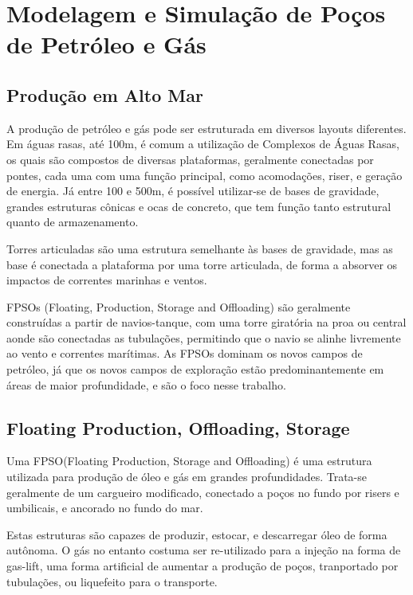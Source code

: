 

\chapter{Modelagem e Simulação de Poços de Petróleo e Gás} \label{chap:2}


\section{Produção em Alto Mar}

A produção de petróleo e gás pode ser estruturada em diversos layouts diferentes.
% 
Em águas rasas, até 100m, é comum a utilização de Complexos de Águas Rasas, os quais são compostos de diversas plataformas, geralmente conectadas por pontes, cada uma com uma função principal, como acomodações, riser, e geração de energia.
%
Já entre 100 e 500m, é possível utilizar-se de bases de gravidade, grandes estruturas cônicas e ocas de concreto, que tem função tanto estrutural quanto de armazenamento. 
%

Torres articuladas são uma estrutura semelhante às bases de gravidade, mas as base é conectada a plataforma por uma torre articulada, de forma a absorver os impactos de correntes marinhas e ventos.
%

FPSOs (Floating, Production, Storage and Offloading) são geralmente construídas a partir de navios-tanque, com uma torre giratória na proa ou central aonde são conectadas as tubulações, permitindo que o navio se alinhe livremente ao vento e correntes marítimas. 
%
As FPSOs dominam os novos campos de petróleo, já que os novos campos de exploração estão predominantemente em áreas de maior profundidade, e são o foco nesse trabalho.

\section{Floating Production, Offloading, Storage}
Uma FPSO(Floating Production, Storage and Offloading) é uma estrutura utilizada para produção de óleo e gás em grandes profundidades. Trata-se geralmente de um cargueiro modificado, conectado a poços no fundo por risers e umbilicais, e ancorado no fundo do mar.

Estas estruturas são capazes de produzir, estocar, e descarregar óleo de forma autônoma. O gás no entanto costuma ser re-utilizado para a injeção na forma de gas-lift, uma forma artificial de aumentar a produção de poços, tranportado por tubulações, ou liquefeito para o transporte.

